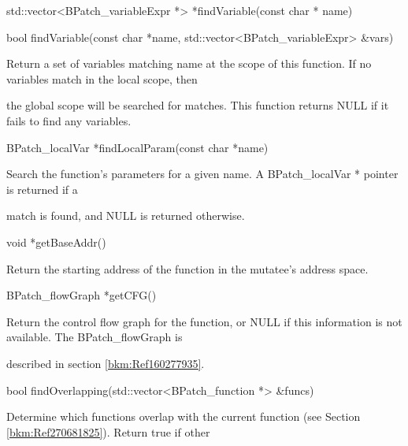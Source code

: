{{{{{{{

std::vector<BPatch_variableExpr *> *findVariable(const char * name)}



{

bool findVariable(const char *name, std::vector<BPatch_variableExpr> &vars)}



{

Return a set of variables matching name at the scope of this function. If no variables match in the local scope, then

the global scope will be searched for matches. This function returns NULL if it fails to find any variables.}



{

BPatch_localVar *findLocalParam(const char *name)}



{

Search the function's parameters for a given name. A BPatch_localVar * pointer is returned if a

match is found, and NULL is returned otherwise.}



{

void *getBaseAddr()}



{

Return the starting address of the function in the mutatee's address space.}



{

BPatch_flowGraph *getCFG()



{

Return the control flow graph for the function, or NULL if this information is not available. The BPatch_flowGraph is

described in section \ref{bkm:Ref160277935}.}





\bigskip



{

bool findOverlapping(std::vector<BPatch_function *> &funcs)



{

Determine which functions overlap with the current function (see Section \ref{bkm:Ref270681825}). Return true if other

}}}}}}}}}
